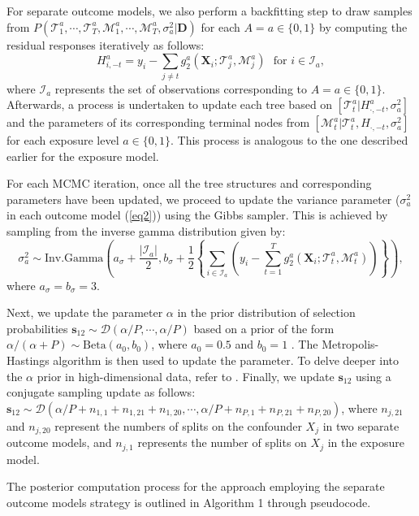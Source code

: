 For separate outcome models, we also perform a backfitting step to draw samples from $P(\mathcal{T}_1^a, \cdots, \mathcal{T}_T^a, \allowbreak \mathcal{M}_1^a, \cdots, \mathcal{M}_T^a, \sigma^2_a | \boldsymbol{D})$ for each $A = a \in \{0, 1\}$ by computing the residual responses iteratively as follows:
\[
H_{i,-t}^a = y_i - \sum_{j\neq t} g_2^a(\boldsymbol{X}_i; \mathcal{T}_j^a, \mathcal{M}_j^a) \,\, \text{ for } i \in \mathcal{I}_a,
\]
where $\mathcal{I}_a$ represents the set of observations corresponding to $A=a \in \{0,1\}$. Afterwards, a process is undertaken to update each tree based on $[\mathcal{T}_t^a | H_{\cdot, -t}^a, \sigma_a^2]$ and the parameters of its corresponding terminal nodes from $[\mathcal{M}_t^a | \mathcal{T}_t^a, H_{\cdot, -t}, \sigma_a^2]$ for each exposure level $a \in \{0,1\}$. This process is analogous to the one described earlier for the exposure model.

For each MCMC iteration, once all the tree structures and corresponding parameters have been updated, we proceed to update the variance parameter ($\sigma^2_a$ in each outcome model (\ref{eq2})) using the Gibbs sampler. This is achieved by sampling from the inverse gamma distribution given by:
\begin{equation*}
\sigma^2_{a} \sim \text{Inv.Gamma}\left(a_\sigma+\frac{|\mathcal{I}_a|}{2}, b_\sigma+\frac{1}{2}\left\{\sum_{i \in \mathcal{I}_a} \left(y_i - \sum_{t=1}^T g_2^a(\boldsymbol{X}_i; \mathcal{T}_t^a, \mathcal{M}_t^a)\right) \right\}\right),
\end{equation*}
where $a_\sigma=b_\sigma=3$.


Next, we update the parameter $\alpha$ in the prior distribution of selection probabilities $\boldsymbol{s}_{12} \sim \mathcal{D}(\alpha/P, \cdots, \alpha/P)$ based on a prior of the form $\alpha/(\alpha+P) \sim \text{Beta}(a_0, b_0)$, where $a_0=0.5$ and $b_0=1$ \citep{linero2018bayesian}. The Metropolis-Hastings algorithm is then used to update the parameter. To delve deeper into the $\alpha$ prior in high-dimensional data, refer to \cite{BART}. Finally, we update $\boldsymbol{s}_{12}$ using a conjugate sampling update as follows:
$\boldsymbol{s}_{12} \sim \mathcal{D}(\alpha/P+n_{1,1}+n_{1,21}+n_{1,20}, \cdots, \alpha/P+n_{P,1}+n_{P,21}+n_{P,20})$, where $n_{j,21}$ and $n_{j,20}$ represent the numbers of splits on the confounder $X_j$ in two separate outcome models, and $n_{j,1}$ represents the number of splits on $X_j$ in the exposure model.

The posterior computation process for the approach employing the separate outcome models strategy is outlined in Algorithm 1 through pseudocode.

